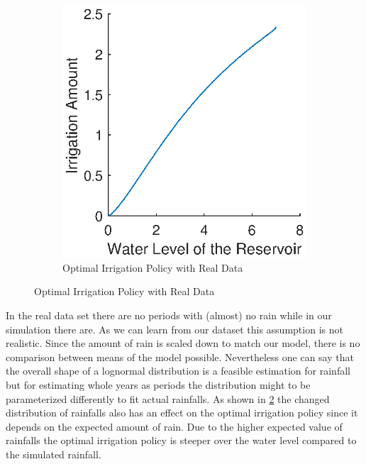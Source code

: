 \documentclass[12pt, a4paper, oneside]{article}
\begin{document}
\begin{figure}[h]
\begin{subfigure}{.5\textwidth}
	\includegraphics[width=1\textwidth]{figures/optimalIrrigationPolicy-real-data.eps}
	\caption{Optimal Irrigation Policy with Real Data}
	\label{fig:optimalIrrigationPolicy-real-data}
\end{subfigure}
\end{figure}
In the real data set there are no periods with (almost) no rain while in our simulation there are.
As we can learn from our dataset this assumption is not realistic.
Since the amount of rain is scaled down to match our model, there is no comparison between means of the model possible.
Nevertheless one can say that the overall shape of a lognormal distribution is a feasible estimation for rainfall but for estimating whole years as periods the distribution might to be parameterized differently to fit actual rainfalls.
As shown in \ref{fig:optimalIrrigationPolicy-real-data} the changed distribution of rainfalls also has an effect on the optimal irrigation policy since it depends on the expected amount of rain.
Due to the higher expected value of rainfalls the optimal irrigation policy is steeper over the water level compared to the simulated rainfall.

\clearpage	
\newpage
\printbibliography

\newpage


\end{document}
